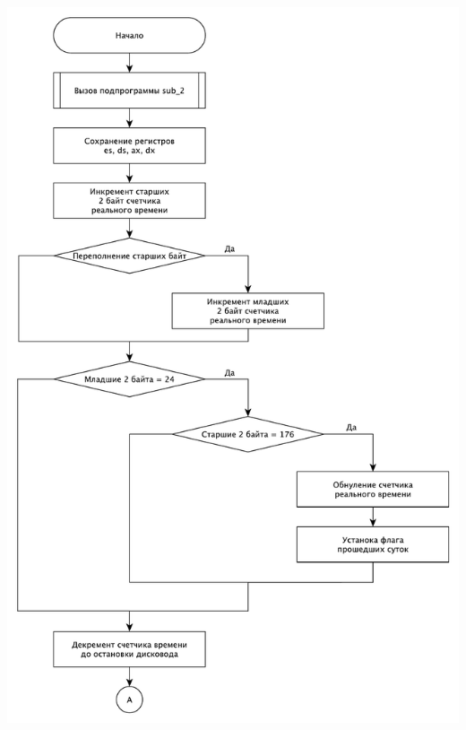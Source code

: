 ﻿\documentclass[a4paper,12pt]{article}
\begin{document}
\begin{center}
    \includegraphics[scale=0.6]{int8h_1}
\end{center}
\end{document}
